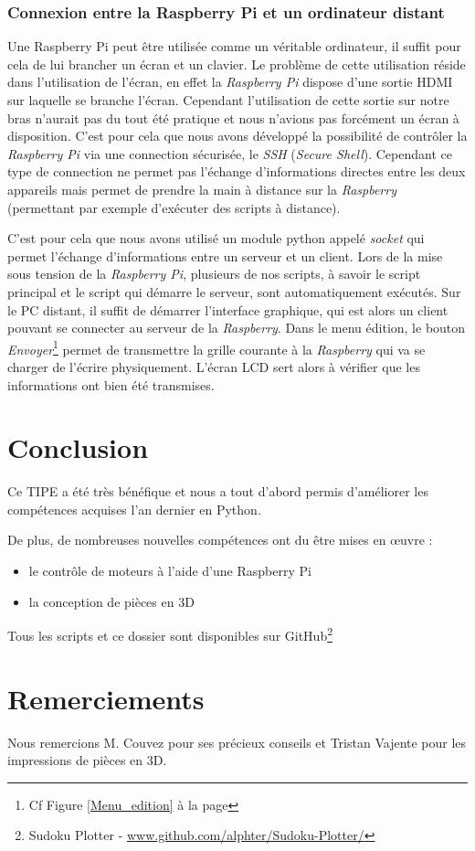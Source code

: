 \documentclass[12pt,a4paper]{report}
\begin{document}
\newpage
\subsection*{Connexion entre la Raspberry Pi et un ordinateur distant}
Une Raspberry Pi peut être utilisée comme un véritable ordinateur, il suffit pour cela de lui brancher un écran et un clavier. Le problème de cette utilisation réside dans l'utilisation de l'écran, en effet la \emph{Raspberry Pi} dispose d'une sortie HDMI sur laquelle se branche l'écran. Cependant l'utilisation de cette sortie sur notre bras n'aurait pas du tout été pratique et nous n'avions pas forcément un écran à disposition. C'est pour cela que nous avons développé la possibilité de contrôler la \emph{Raspberry Pi} via une connection sécurisée, le \emph{SSH} (\emph{Secure Shell}). Cependant ce type de connection ne permet pas l'échange d'informations directes entre les deux appareils mais permet de prendre la main à distance sur la \emph{Raspberry} (permettant par exemple d'exécuter des scripts à distance).


C'est pour cela que nous avons utilisé un module python appelé \emph{socket} qui permet l'échange d'informations entre un serveur et un client. Lors de la mise sous tension de la \emph{Raspberry Pi}, plusieurs de nos scripts, à savoir le script principal et le script qui démarre le serveur, sont automatiquement exécutés. Sur le PC distant, il suffit de démarrer l'interface graphique, qui est alors un client pouvant se connecter au serveur de la \emph{Raspberry}. Dans le menu édition, le bouton \emph{Envoyer}\footnote{Cf Figure \ref{Menu_edition} à la page \pageref{Menu_edition}} permet de transmettre la grille courante à la \emph{Raspberry} qui va se charger de l'écrire physiquement. L'écran LCD sert alors à vérifier que les informations ont bien été transmises.

\chapter*{Conclusion}
Ce TIPE a été très bénéfique et nous a tout d'abord permis d'améliorer les compétences acquises l'an dernier en Python.

De plus, de nombreuses nouvelles compétences ont du être mises en œuvre :

\begin{itemize}[label=--]
\item le contrôle de moteurs à l'aide d'une Raspberry Pi
\item la conception de pièces en 3D

\end{itemize}
Tous les scripts et ce dossier sont disponibles sur GitHub\footnote{Sudoku Plotter - \url{www.github.com/alphter/Sudoku-Plotter/}}

\chapter*{Remerciements}

Nous remercions M. Couvez pour ses précieux conseils et Tristan Vajente pour les impressions de pièces en 3D.

%
\end{document}

